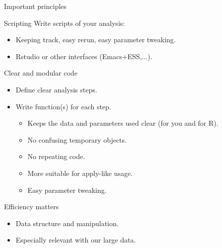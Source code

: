 \documentclass[10pt]{beamer}
\begin{document}
\begin{frame}{Important principles}
  \begin{block}{Scripting}
    Write scripts of your analysis: 
    \begin{itemize}
    \item Keeping track, easy rerun, easy parameter tweaking.
    \item {\sf Rstudio} or other interfaces ({\sf Emacs+ESS},...).
    \end{itemize}
  \end{block}
  \begin{block}{Clear and modular code}
    \begin{itemize}
    \item Define clear analysis steps.
    \item Write function(s) for each step.
      \begin{itemize}
      \item Keeps the data and parameters used clear (for you and for R).
      \item No confusing temporary objects.
      \item No repeating code.
      \item More suitable for {\sf apply}-like usage.
      \item Easy parameter tweaking.
      \end{itemize}
    \end{itemize}
  \end{block}
  \begin{block}{Efficiency matters}
    \begin{itemize}
    \item Data structure and manipulation.
    \item Especially relevant with our large data.
    \end{itemize}

  \end{block}
\end{frame}

\end{document}
